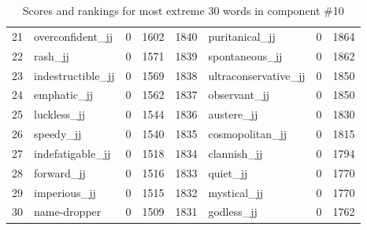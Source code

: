 \begin{table}[tbp]
\begin{tabular}{| rlr@{.}l | rlr@{.}l |}
    21 & overconfident\_jj & 0 & 1602    &    1840 & puritanical\_jj & 0 & 1864 \\
    22 & rash\_jj & 0 & 1571    &    1839 & spontaneous\_jj & 0 & 1862 \\
    23 & indestructible\_jj & 0 & 1569    &    1838 & ultraconservative\_jj & 0 & 1850 \\
    24 & emphatic\_jj & 0 & 1562    &    1837 & observant\_jj & 0 & 1850 \\
    25 & luckless\_jj & 0 & 1544    &    1836 & austere\_jj & 0 & 1830 \\
    26 & speedy\_jj & 0 & 1540    &    1835 & cosmopolitan\_jj & 0 & 1815 \\
    27 & indefatigable\_jj & 0 & 1518    &    1834 & clannish\_jj & 0 & 1794 \\
    28 & forward\_jj & 0 & 1516    &    1833 & quiet\_jj & 0 & 1770 \\
    29 & imperious\_jj & 0 & 1515    &    1832 & mystical\_jj & 0 & 1770 \\
    30 & name-dropper & 0 & 1509    &    1831 & godless\_jj & 0 & 1762 \\
    \hline
    \end{tabular}
    \caption{Scores and rankings for most extreme 30 words in component \#10} 
\end{table}
\clearpage
